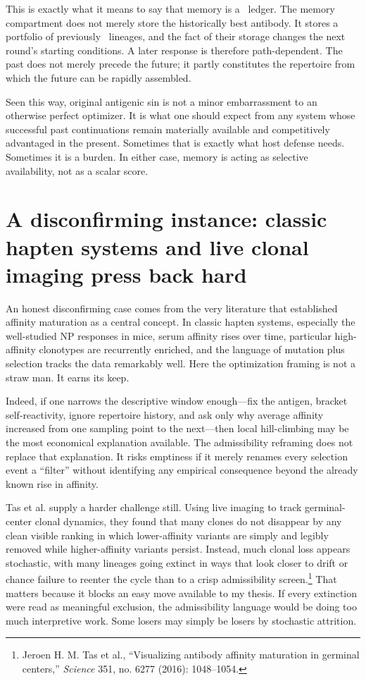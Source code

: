 \documentclass[11pt]{article}
\begin{document}
This is exactly what it means to say that memory is a \continuation\ ledger. The memory compartment does not merely store the historically best antibody. It stores a portfolio of previously \admissible\ lineages, and the fact of their storage changes the next round's starting conditions. A later response is therefore path-dependent. The past does not merely precede the future; it partly constitutes the repertoire from which the future can be rapidly assembled.

Seen this way, original antigenic sin is not a minor embarrassment to an otherwise perfect optimizer. It is what one should expect from any system whose successful past continuations remain materially available and competitively advantaged in the present. Sometimes that is exactly what host defense needs. Sometimes it is a burden. In either case, memory is acting as selective availability, not as a scalar score.

\section{A disconfirming instance: classic hapten systems and live clonal imaging press back hard}
An honest disconfirming case comes from the very literature that established affinity maturation as a central concept. In classic hapten systems, especially the well-studied NP responses in mice, serum affinity rises over time, particular high-affinity clonotypes are recurrently enriched, and the language of mutation plus selection tracks the data remarkably well. Here the optimization framing is not a straw man. It earns its keep.

Indeed, if one narrows the descriptive window enough---fix the antigen, bracket self-reactivity, ignore repertoire history, and ask only why average affinity increased from one sampling point to the next---then local hill-climbing may be the most economical explanation available. The admissibility reframing does not replace that explanation. It risks emptiness if it merely renames every selection event a ``filter'' without identifying any empirical consequence beyond the already known rise in affinity.

Tas et al. supply a harder challenge still. Using live imaging to track germinal-center clonal dynamics, they found that many clones do not disappear by any clean visible ranking in which lower-affinity variants are simply and legibly removed while higher-affinity variants persist. Instead, much clonal loss appears stochastic, with many lineages going extinct in ways that look closer to drift or chance failure to reenter the cycle than to a crisp admissibility screen.\footnote{Jeroen H. M. Tas et al., ``Visualizing antibody affinity maturation in germinal centers,'' \emph{Science} 351, no. 6277 (2016): 1048--1054.} That matters because it blocks an easy move available to my thesis. If every extinction were read as meaningful exclusion, the admissibility language would be doing too much interpretive work. Some losers may simply be losers by stochastic attrition.
\end{document}
